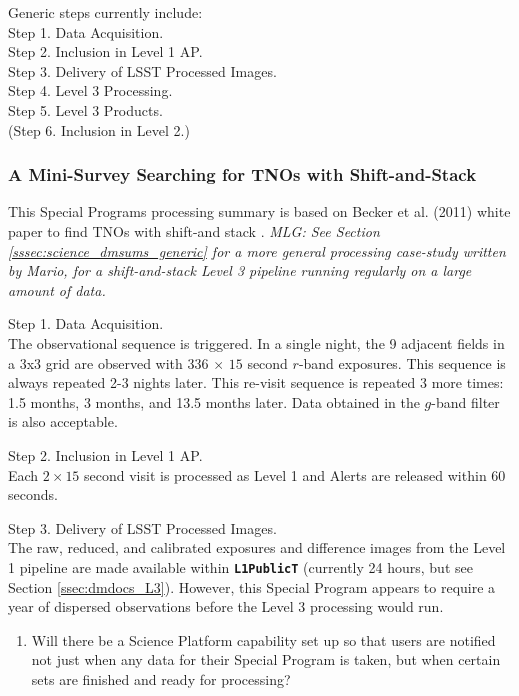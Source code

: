 \documentclass[DM,lsstdraft,toc]{lsstdoc}
\begin{document}
Generic steps currently include: \\
Step 1. Data Acquisition. \\
Step 2. Inclusion in Level 1 AP. \\
Step 3. Delivery of LSST Processed Images. \\
Step 4. Level 3 Processing. \\
Step 5. Level 3 Products. \\
(Step 6. Inclusion in Level 2.) \\

\subsubsection{A Mini-Survey Searching for TNOs with Shift-and-Stack}

This Special Programs processing summary is based on Becker et al. (2011) white paper to find TNOs with shift-and stack \citep{BeckerWP}. {\it MLG: See Section \ref{sssec:science_dmsums_generic} for a more general processing case-study written by Mario, for a shift-and-stack Level 3 pipeline running regularly on a large amount of data.}

Step 1. Data Acquisition. \\ The observational sequence is triggered. In a single night, the 9 adjacent fields in a 3x3 grid are observed with $336$ $\times$ $15$ second $r$-band exposures. This sequence is always repeated 2-3 nights later. This re-visit sequence is repeated 3 more times: 1.5 months, 3 months, and 13.5 months later. Data obtained in the $g$-band filter is also acceptable. \citep{BeckerWP}

Step 2. Inclusion in Level 1 AP. \\ Each $2\times15$ second visit is processed as Level 1 and Alerts are released within 60 seconds.

Step 3. Delivery of LSST Processed Images. \\ The raw, reduced, and calibrated exposures and difference images from the Level 1 pipeline are made available within {\tt \textbf{L1PublicT}} (currently 24 hours, but see Section \ref{ssec:dmdocs_L3}). However, this Special Program appears to require a year of dispersed observations before the Level 3 processing would run.
\begin{enumerate}[resume,topsep=-10pt,label= \textbf{Concern \Roman*.}] \item \label{C13} Will there be a Science Platform capability set up so that users are notified not just when any data for their Special Program is taken, but when certain sets are finished and ready for processing? \end{enumerate}
\end{document}
